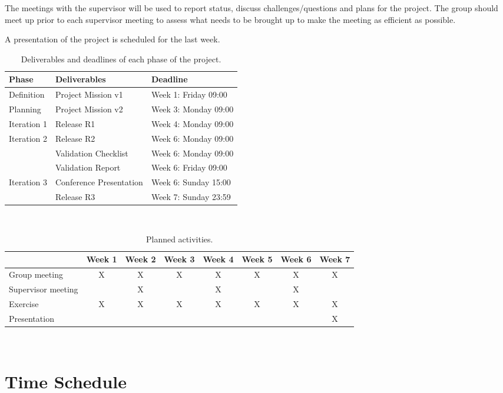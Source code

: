 \documentclass[10pt,a4paper]{article}
\begin{document}
The meetings with the supervisor will be used to report status, discuss challenges/questions and plans for the project. The group should meet up prior to each supervisor meeting to assess what needs to be brought up to make the meeting as efficient as possible. 

A presentation of the project is scheduled for the last week.



\begin{table}[h!]
\centering
\caption{Deliverables and deadlines of each phase of the project.}
\label{table:deliv}
\begin{tabular}{|l|l|l|} \hline
\textbf{Phase} & \textbf{Deliverables} & \textbf{Deadline}\\ \hline
Definition & Project Mission v1 & Week 1: Friday 09:00\\ \hline
Planning & Project Mission v2 & Week 3: Monday 09:00\\ \hline
Iteration 1 & Release R1 & Week 4: Monday 09:00\\ \hline
Iteration 2 & Release R2 & Week 6: Monday 09:00\\ \hline
& Validation Checklist & Week 6: Monday 09:00\\ \hline
& Validation Report & Week 6: Friday 09:00\\ \hline
Iteration 3 & Conference Presentation & Week 6: Sunday 15:00\\ \hline
& Release R3 & Week 7: Sunday 23:59\\ \hline
\end{tabular}\\
\end{table}

\begin{table}[h!]
\centering
\caption{Planned activities.}
\label{table:meet}
\begin{tabular}{|l|c|c|c|c|c|c|c|} \hline
&Week 1 & Week 2 & Week 3 & Week 4 & Week 5 & Week 6 & Week 7\\ \hline
Group meeting & X &X&X&X&X&X&X\\ \hline
Supervisor meeting &&X&&X&&X&\\ \hline
Exercise & X &X&X&X&X&X&X\\ \hline
Presentation &&&&&&&X\\ \hline 
\end{tabular}\\
\end{table}


\section{Time Schedule}
\end{document}
